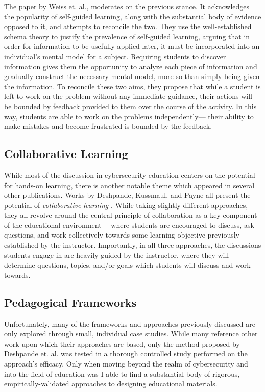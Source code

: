     The paper by Weiss et. al., moderates on the previous stance. %
It acknowledges the popularity of self-guided learning, along with the substantial body of evidence opposed to it, and attempts to reconcile the two. %
They use the well-established schema theory to justify the prevalence of self-guided learning, arguing that in order for information to be usefully applied later, it must be incorporated into an individual's mental model for a subject. %
Requiring students to discover information gives them the opportunity to analyze each piece of information and gradually construct the necessary mental model, more so than simply being given the information. %
To reconcile these two aims, they propose that while a student is left to work on the problem without any immediate guidance, their actions will be bounded by feedback provided to them over the course of the activity. %
In this way, students are able to work on the problems independently---%
their ability to make mistakes and become frustrated is bounded by the feedback. 

\subsection{Collaborative Learning}

    While most of the discussion in cybersecurity education centers on the potential for hands-on learning, there is another notable theme which appeared in several other publications. 
    Works by Deshpande, Kussmaul, and Payne all present the potential of \emph{collaborative learning} \cite{P-Deshpande,C-Kussmaul,B-Payne}. %
While taking slightly different approaches, they all revolve around the central principle of collaboration as a key component of the educational environment---%
where students are encouraged to discuss, ask questions, and work collectively towards some learning objective previously established by the instructor. %
Importantly, in all three approaches, the discussions students engage in are heavily guided by the instructor, where they will determine questions, topics, and/or goals which students will discuss and work towards. 

\subsection{Pedagogical Frameworks}

    Unfortunately, many of the frameworks and approaches previously discussed are only explored through small, individual case studies. %
While many reference other work upon which their approaches are based, only the method proposed by Deshpande et. al. was tested in a thorough controlled study performed on the approach's efficacy. %
Only when moving beyond the realm of cybersecurity and into the field of education was I able to find a substantial body of rigorous, empirically-validated approaches to designing educational materials. 

